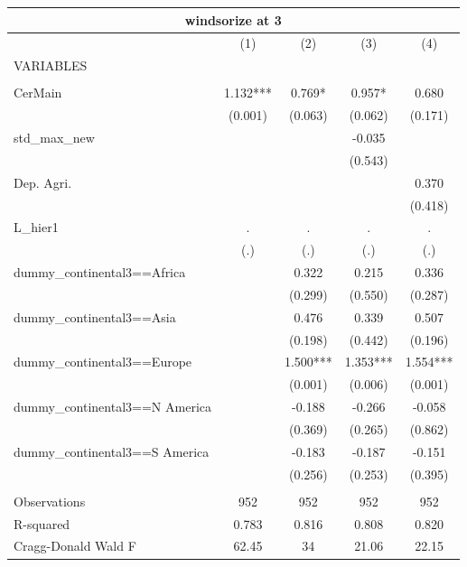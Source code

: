 \documentclass[12pt,a4paper]{article}
\begin{document}
\begin{tabular}{lcccc}
\multicolumn{5}{c}{windsorize at 3} \\ \hline
 & (1) & (2) & (3) & (4) \\
VARIABLES &  &  &  &  \\ \hline
 &  &  &  &  \\
CerMain & 1.132*** & 0.769* & 0.957* & 0.680 \\
 & (0.001) & (0.063) & (0.062) & (0.171) \\
std\_max\_new &  &  & -0.035 &  \\
 &  &  & (0.543) &  \\
Dep. Agri. &  &  &  & 0.370 \\
 &  &  &  & (0.418) \\
L\_hier1 & . & . & . & . \\
 & (.) & (.) & (.) & (.) \\
dummy\_continental3==Africa &  & 0.322 & 0.215 & 0.336 \\
 &  & (0.299) & (0.550) & (0.287) \\
dummy\_continental3==Asia &  & 0.476 & 0.339 & 0.507 \\
 &  & (0.198) & (0.442) & (0.196) \\
dummy\_continental3==Europe &  & 1.500*** & 1.353*** & 1.554*** \\
 &  & (0.001) & (0.006) & (0.001) \\
dummy\_continental3==N America &  & -0.188 & -0.266 & -0.058 \\
 &  & (0.369) & (0.265) & (0.862) \\
dummy\_continental3==S America &  & -0.183 & -0.187 & -0.151 \\
 &  & (0.256) & (0.253) & (0.395) \\
 &  &  &  &  \\
Observations & 952 & 952 & 952 & 952 \\
R-squared & 0.783 & 0.816 & 0.808 & 0.820 \\
 Cragg-Donald Wald F & 62.45 & 34 & 21.06 & 22.15 \\ \hline
\end{tabular}
\end{document}

